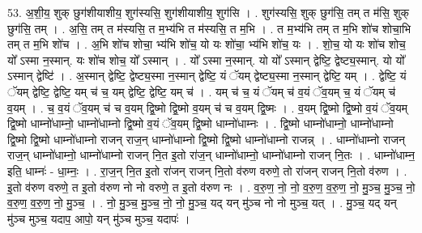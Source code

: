 \documentclass[17pt]{extarticle}
\begin{document}
53. अ॒शी॒य॒ शुक् छुग॑शीयाशीय॒ शुग॑स्यसि॒ शुग॑शीयाशीय॒ शुग॑सि । . शुग॑स्यसि॒ शुक् छुग॑सि॒ तम् त म॑सि॒ शुक् छुग॑सि॒ तम् । . अ॒सि॒ तम् त म॑स्यसि॒ त म॒भ्य॑भि त म॑स्यसि॒ त म॒भि । . त म॒भ्य॑भि तम् त म॒भि शो॑च शोचा॒भि तम् त म॒भि शो॑च । . अ॒भि शो॑च शोचा॒ भ्य॑भि शो॑च॒ यो यः शो॑चा॒ भ्य॑भि शो॑च॒ यः । . शो॒च॒ यो यः शो॑च शोच॒ यो᳚ ऽस्मा न॒स्मान्. यः शो॑च शोच॒ यो᳚ ऽस्मान् । . यो᳚ ऽस्मा न॒स्मान्. यो यो᳚ ऽस्मान् द्वेष्टि॒ द्वेष्ट्य॒स्मान्. यो यो᳚ ऽस्मान् द्वेष्टि॑ । . अ॒स्मान् द्वेष्टि॒ द्वेष्ट्य॒स्मा न॒स्मान् द्वेष्टि॒ यं ॅयम् द्वेष्ट्य॒स्मा न॒स्मान् द्वेष्टि॒ यम् । . द्वेष्टि॒ यं ॅयम् द्वेष्टि॒ द्वेष्टि॒ यम् च॑ च॒ यम् द्वेष्टि॒ द्वेष्टि॒ यम् च॑ । . यम् च॑ च॒ यं ॅयम् च॑ व॒यं ॅव॒यम् च॒ यं ॅयम् च॑ व॒यम् । . च॒ व॒यं ॅव॒यम् च॑ च व॒यम् द्वि॒ष्मो द्वि॒ष्मो व॒यम् च॑ च व॒यम् द्वि॒ष्मः । . व॒यम् द्वि॒ष्मो द्वि॒ष्मो व॒यं ॅव॒यम् द्वि॒ष्मो धाम्नो॑धाम्नो॒ धाम्नो॑धाम्नो द्वि॒ष्मो व॒यं ॅव॒यम् द्वि॒ष्मो धाम्नो॑धाम्नः । . द्वि॒ष्मो धाम्नो॑धाम्नो॒ धाम्नो॑धाम्नो द्वि॒ष्मो द्वि॒ष्मो धाम्नो॑धाम्नो राजन् राज॒न् धाम्नो॑धाम्नो द्वि॒ष्मो द्वि॒ष्मो धाम्नो॑धाम्नो राजन्न् । . धाम्नो॑धाम्नो राजन् राज॒न् धाम्नो॑धाम्नो॒ धाम्नो॑धाम्नो राजन् नि॒त इ॒तो रा॑ज॒न् धाम्नो॑धाम्नो॒ धाम्नो॑धाम्नो राजन् नि॒तः । . धाम्नो॑धाम्न॒ इति॒ धाम्नः॑ - धा॒म्नः॒ । . रा॒ज॒न् नि॒त इ॒तो रा॑जन् राजन् नि॒तो व॑रुण वरुणे॒ तो रा॑जन् राजन् नि॒तो व॑रुण । . इ॒तो व॑रुण वरुणे॒ त इ॒तो व॑रुण नो नो वरुणे॒ त इ॒तो व॑रुण नः । . व॒रु॒ण॒ नो॒ नो॒ व॒रु॒ण॒ व॒रु॒ण॒ नो॒ मु॒ञ्च॒ मु॒ञ्च॒ नो॒ व॒रु॒ण॒ व॒रु॒ण॒ नो॒ मु॒ञ्च॒ । . नो॒ मु॒ञ्च॒ मु॒ञ्च॒ नो॒ नो॒ मु॒ञ्च॒ यद् यन् मु॑ञ्च नो नो मुञ्च॒ यत् । . मु॒ञ्च॒ यद् यन् मु॑ञ्च मुञ्च॒ यदाप॒ आपो॒ यन् मु॑ञ्च मुञ्च॒ यदापः॑ । \newline
\end{document}
